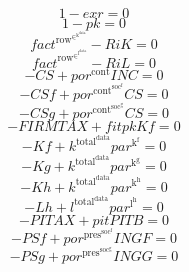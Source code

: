 \begin{equation}
1 - {e\!x\!r} = 0
\end{equation}
\begin{equation}
1 - {p\!k} = 0
\end{equation}
\begin{equation}
{f\!a\!c\!t}^{\mathrm{row}^{\in^{\mathrm{k}^{\mathrm{data}}}}} - {R\!i\!K} = 0
\end{equation}
\begin{equation}
{f\!a\!c\!t}^{\mathrm{row}^{\in^{\mathrm{l}^{\mathrm{data}}}}} - {R\!i\!L} = 0
\end{equation}
\begin{equation}
-{C\!S} + {{p\!o\!r}^{\mathrm{cont}}} {{I\!N\!C}} = 0
\end{equation}
\begin{equation}
-{C\!S\!f} + {{p\!o\!r}^{\mathrm{cont}^{\mathrm{soc}^{\mathrm{f}}}}} {{C\!S}} = 0
\end{equation}
\begin{equation}
-{C\!S\!g} + {{p\!o\!r}^{\mathrm{cont}^{\mathrm{soc}^{\mathrm{g}}}}} {{C\!S}} = 0
\end{equation}
\begin{equation}
-{F\!I\!R\!M\!T\!A\!X} + {{f\!i\!t}} {{p\!k}} {{K\!f}} = 0
\end{equation}
\begin{equation}
-{K\!f} + {k^{\mathrm{total}^{\mathrm{data}}}} {{p\!a\!r}^{\mathrm{k}^{\mathrm{f}}}} = 0
\end{equation}
\begin{equation}
-{K\!g} + {k^{\mathrm{total}^{\mathrm{data}}}} {{p\!a\!r}^{\mathrm{k}^{\mathrm{g}}}} = 0
\end{equation}
\begin{equation}
-{K\!h} + {k^{\mathrm{total}^{\mathrm{data}}}} {{p\!a\!r}^{\mathrm{k}^{\mathrm{h}}}} = 0
\end{equation}
\begin{equation}
-{L\!h} + {l^{\mathrm{total}^{\mathrm{data}}}} {{p\!a\!r}^{\mathrm{l}^{\mathrm{h}}}} = 0
\end{equation}
\begin{equation}
-{P\!I\!T\!A\!X} + {{p\!i\!t}} {{P\!I\!T\!B}} = 0
\end{equation}
\begin{equation}
-{P\!S\!f} + {{p\!o\!r}^{\mathrm{pres}^{\mathrm{soc}^{\mathrm{f}}}}} {{I\!N\!G\!F}} = 0
\end{equation}
\begin{equation}
-{P\!S\!g} + {{p\!o\!r}^{\mathrm{pres}^{\mathrm{soc}^{\mathrm{g}}}}} {{I\!N\!G\!G}} = 0
\end{equation}
